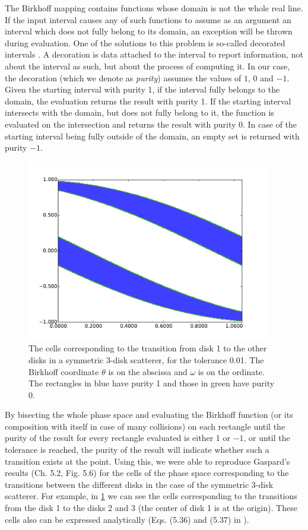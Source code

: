\documentclass[pre, amsmath, amssymb, onecolumn, showpacs]{revtex4-1}
\begin{document}
The Birkhoff mapping contains functions whose domain is not the whole real line. If the input interval causes any of such functions to assume as an argument an interval which does not fully belong to its domain, an exception will be thrown during evaluation. One of the solutions to this problem is so-called decorated intervals \cite{nehmeier2014libieeep1788}. A decoration is data attached to the interval to report information, not about the interval as such, but about the process of computing it. In our case, the decoration (which we denote as \textit{purity}) assumes the values of $1$, $0$ and $-1$. Given the starting interval with purity 1, if the interval fully belongs to the domain, the evaluation returns the result with purity 1. If the starting interval intersects with the domain, but does not fully belong to it, the function is evaluated on the intersection and returns the result with purity 0. In case of the starting interval being fully outside of the domain, an empty set is returned with purity $-1$.

\begin{figure}
\centering
\includegraphics*[width=300pt]{birkhoff-12-and-13_tol=1e-2.pdf}
\caption{The cells corresponding to the transition from disk 1 to the other disks in a symmetric 3-disk scatterer, for the tolerance 0.01. The Birkhoff coordinate $\theta$ is on the abscissa and $\omega$ is on the ordinate. The rectangles in blue have purity 1 and those in green have purity 0.}
\label{fig01}
\end{figure}

By bisecting the whole phase space and evaluating the Birkhoff function (or its composition with itself in case of many collisions) on each rectangle until the purity of the result for every rectangle evaluated is either 1 or $-1$, or until the tolerance is reached, the purity of the result will indicate whether such a transition exists at the point. Using this, we were able to reproduce Gaspard's results (Ch. 5.2, Fig. 5.6) for the cells of the phase space corresponding to the transitions between the different disks in the case of the symmetric 3-disk scatterer. For example, in \ref{fig01} we can see the cells corresponding to the transitions from the disk 1 to the disks 2 and 3 (the center of disk 1 is at the origin). These cells also can be expressed analytically (Eqs. (5.36) and (5.37) in \cite{gaspard2005chaos}). 
\end{document}
